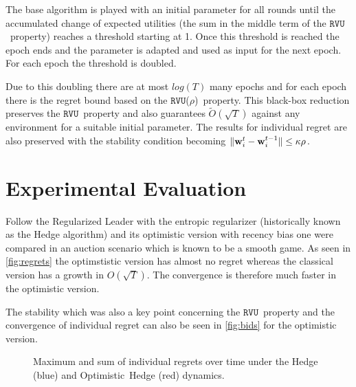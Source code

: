 \documentclass[a4paper]{article}
\theoremstyle{definition}
\newcommand{\myprop}{\ensuremath{\texttt{RVU}}}
\newcommand{\mst}{\ensuremath{w}}
\newcommand{\stable}{\ensuremath{\kappa}}
\newcommand{\knob}{\ensuremath{\rho}}
\renewcommand{\vec}[1]{\ensuremath{{\bf #1}}}
\begin{document}
The base algorithm is played with an initial parameter for all rounds
until the accumulated change of expected utilities (the sum in the
middle term of the \myprop~property) reaches a threshold starting at
1.
Once this threshold is reached the epoch ends and the parameter is
adapted and used as input for the next epoch. For each epoch the
threshold is doubled.

Due to this doubling there are at most $log(T)$ many epochs and for
each epoch there is the regret bound based on the
\myprop(\knob)~property.
This black-box reduction preserves the \myprop~property and also
guarantees $\tilde{O}(\sqrt{T})$ against any environment for a
suitable initial parameter.
The results for individual regret are also preserved with the stability
condition becoming $\|\vec{\mst}_i^t-\vec{\mst}_i^{t-1}\| \leq \stable\knob$.



\section{Experimental Evaluation}

Follow the Regularized Leader with the entropic regularizer
(historically known as the Hedge algorithm) and its optimistic version
with recency bias one were compared in an auction scenario which is
known to be a smooth game.
As seen in \autoref{fig:regrets} the optimstistic version has almost no regret
whereas the classical version has a growth in $O(\sqrt{T})$.
The convergence is therefore much faster in the optimistic version.

The stability which was also a key point concerning the
\myprop~property and the convergence of individual regret can also be
seen in \autoref{fig:bids} for the optimistic version.

\begin{figure}[]
\centering
{}
\quad
{}
\caption{Maximum and sum of individual regrets over time under the
  Hedge (blue) and \mbox{Optimistic Hedge} (red) dynamics.}\label{fig:regrets}
\end{figure}
\end{document}
